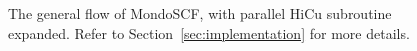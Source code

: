\documentclass[preprint]{revtex4}
\begin{document}
\begin{figure}[t]
\caption{The general flow of MondoSCF, with parallel HiCu subroutine
expanded.  Refer to Section~\ref{sec:implementation} for more
details.}
\label{fig:parahicu}
\end{figure}
\end{document}
